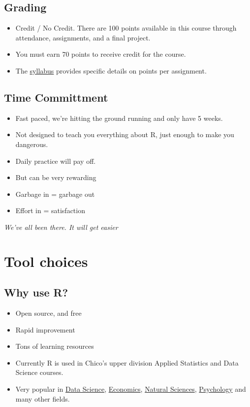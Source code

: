 \documentclass[]{article}
\providecommand{\tightlist}{%
  \setlength{\itemsep}{0pt}\setlength{\parskip}{0pt}}
\begin{document}
\hypertarget{grading}{%
\subsection{Grading}\label{grading}}

\begin{itemize}
\tightlist
\item
  Credit / No Credit. There are 100 points available in this course
  through attendance, assignments, and a final project.
\item
  You must earn 70 points to receive credit for the course.
\item
  The \href{../syllabus.html}{syllabus} provides specific details on
  points per assignment.
\end{itemize}

\hypertarget{time-committment}{%
\subsection{Time Committment}\label{time-committment}}

\begin{itemize}
\tightlist
\item
  Fast paced, we're hitting the ground running and only have 5 weeks.
\item
  Not designed to teach you everything about R, just enough to make you
  dangerous.
\item
  Daily practice will pay off.
\item
  But can be very rewarding
\item
  Garbage in = garbage out
\item
  Effort in = satisfaction
\end{itemize}

\emph{We've all been there. It will get easier}

\hypertarget{tool-choices}{%
\section{Tool choices}\label{tool-choices}}

\hypertarget{why-use-r}{%
\subsection{Why use R?}\label{why-use-r}}

\begin{itemize}
\tightlist
\item
  Open source, and free
\item
  Rapid improvement
\item
  Tons of learning resources
\item
  Currently R is used in Chico's upper division Applied Statistics and
  Data Science courses.
\item
  Very popular in \href{https://r4ds.had.co.nz/}{Data Science},
  \href{https://www.core-econ.org/why-doing-economics-has-embraced-r/}{Economics},
  \href{https://www.nature.com/news/programming-tools-adventures-with-r-1.16609}{Natural
  Sciences}, \href{https://personality-project.org/r/}{Psychology} and
  many other fields.
\end{itemize}
\end{document}
